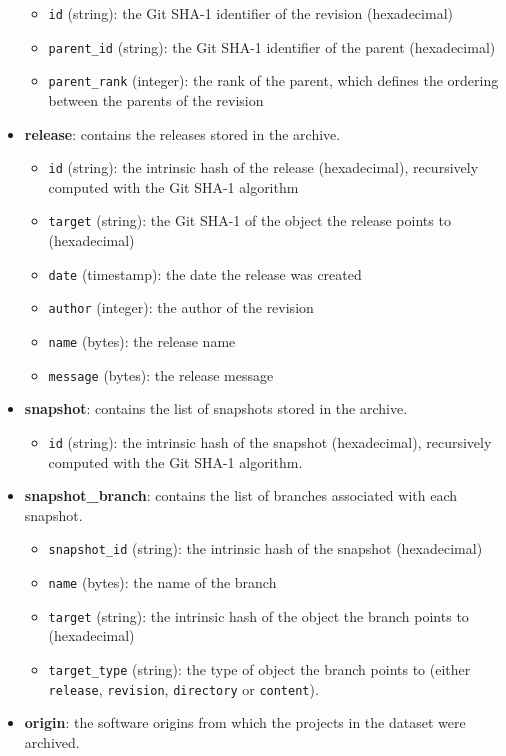 \begin{itemize}
  \begin{itemize}
  \tightlist
  \item
    \texttt{id} (string): the Git SHA-1 identifier of the revision
    (hexadecimal)
  \item
    \texttt{parent\_id} (string): the Git SHA-1 identifier of the parent
    (hexadecimal)
  \item
    \texttt{parent\_rank} (integer): the rank of the parent, which
    defines the ordering between the parents of the revision
  \end{itemize}
\item
  \textbf{release}: contains the releases stored in the archive.

  \begin{itemize}
  \tightlist
  \item
    \texttt{id} (string): the intrinsic hash of the release
    (hexadecimal), recursively computed with the Git SHA-1 algorithm
  \item
    \texttt{target} (string): the Git SHA-1 of the object the release
    points to (hexadecimal)
  \item
    \texttt{date} (timestamp): the date the release was created
  \item
    \texttt{author} (integer): the author of the revision
  \item
    \texttt{name} (bytes): the release name
  \item
    \texttt{message} (bytes): the release message
  \end{itemize}
\item
  \textbf{snapshot}: contains the list of snapshots stored in the
  archive.

  \begin{itemize}
  \tightlist
  \item
    \texttt{id} (string): the intrinsic hash of the snapshot
    (hexadecimal), recursively computed with the Git SHA-1 algorithm.
  \end{itemize}
\item
  \textbf{snapshot\_branch}: contains the list of branches associated
  with each snapshot.

  \begin{itemize}
  \tightlist
  \item
    \texttt{snapshot\_id} (string): the intrinsic hash of the snapshot
    (hexadecimal)
  \item
    \texttt{name} (bytes): the name of the branch
  \item
    \texttt{target} (string): the intrinsic hash of the object the
    branch points to (hexadecimal)
  \item
    \texttt{target\_type} (string): the type of object the branch points
    to (either \texttt{release}, \texttt{revision}, \texttt{directory}
    or \texttt{content}).
  \end{itemize}
\item
  \textbf{origin}: the software origins from which the projects in the
  dataset were archived.


\end{itemize}
